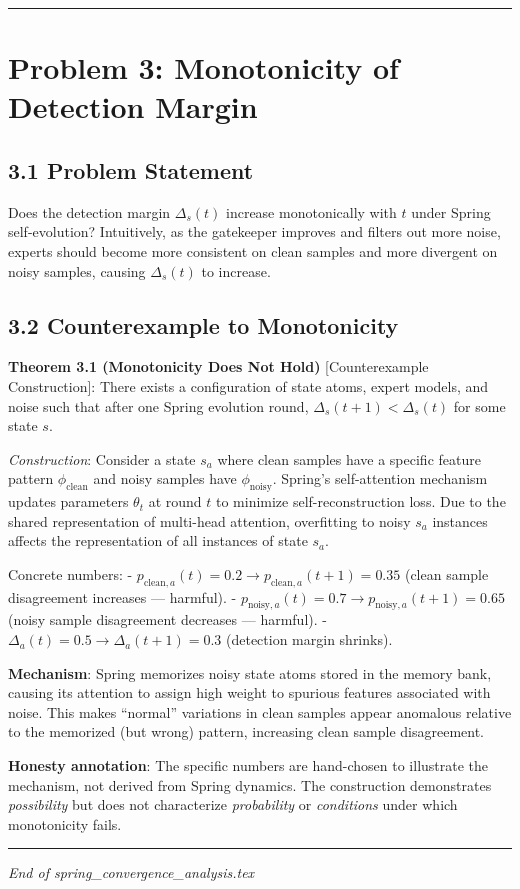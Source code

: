 \documentclass[
  12pt,
]{article}
\begin{document}
\begin{center}\rule{0.5\linewidth}{0.5pt}\end{center}

\section{Problem 3: Monotonicity of Detection Margin}\label{problem-3-monotonicity}

\subsection{3.1 Problem Statement}\label{problem-statement-monotonicity}

Does the detection margin $\Delta_s(t)$ increase monotonically with $t$ under Spring self-evolution? Intuitively, as the gatekeeper improves and filters out more noise, experts should become more consistent on clean samples and more divergent on noisy samples, causing $\Delta_s(t)$ to increase.

\subsection{3.2 Counterexample to Monotonicity}\label{counterexample-monotonicity}

\textbf{Theorem 3.1 (Monotonicity Does Not Hold)} [Counterexample Construction]: There exists a configuration of state atoms, expert models, and noise such that after one Spring evolution round, $\Delta_s(t+1) < \Delta_s(t)$ for some state $s$.

\emph{Construction}: Consider a state $s_a$ where clean samples have a specific feature pattern $\phi_{\text{clean}}$ and noisy samples have $\phi_{\text{noisy}}$. Spring's self-attention mechanism updates parameters $\theta_t$ at round $t$ to minimize self-reconstruction loss. Due to the shared representation of multi-head attention, overfitting to noisy $s_a$ instances affects the representation of all instances of state $s_a$.

Concrete numbers:
- $p_{\text{clean},a}(t) = 0.2 \to p_{\text{clean},a}(t+1) = 0.35$ (clean sample disagreement increases --- harmful).
- $p_{\text{noisy},a}(t) = 0.7 \to p_{\text{noisy},a}(t+1) = 0.65$ (noisy sample disagreement decreases --- harmful).
- $\Delta_a(t) = 0.5 \to \Delta_a(t+1) = 0.3$ (detection margin shrinks).

\textbf{Mechanism}: Spring memorizes noisy state atoms stored in the memory bank, causing its attention to assign high weight to spurious features associated with noise. This makes ``normal'' variations in clean samples appear anomalous relative to the memorized (but wrong) pattern, increasing clean sample disagreement.

\textbf{Honesty annotation}: The specific numbers are hand-chosen to illustrate the mechanism, not derived from Spring dynamics. The construction demonstrates \emph{possibility} but does not characterize \emph{probability} or \emph{conditions} under which monotonicity fails.

\begin{center}\rule{0.5\linewidth}{0.5pt}\end{center}

\emph{End of spring\_convergence\_analysis.tex}
\end{document}
